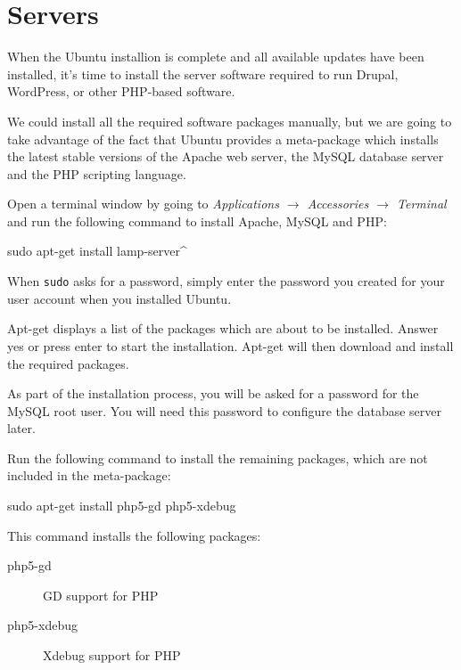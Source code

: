 \documentclass[ebook,10pt,twoside,openright]{memoir}
\begin{document}
\chapter{Servers} \label{chservers}

\noindent
When the Ubuntu installion is complete and all available updates have been installed, it’s time to install the server software required to run Drupal, WordPress, or other PHP-based software.

We could install all the required software packages manually, but we are going to take advantage of the fact that Ubuntu provides a meta-package which installs the latest stable versions of the Apache web server, the MySQL database server and the PHP scripting language.

Open a terminal window by going to \emph{Applications $\rightarrow$ Accessories $\rightarrow$ Terminal} and run the following command to install Apache, MySQL and PHP:

\begin{squashboxcommand}
sudo apt-get install lamp-server^
\end{squashboxcommand}

When \verb!sudo! asks for a password, simply enter the password you created for your user account when you installed Ubuntu.

Apt-get displays a list of the packages which are about to be installed. Answer yes or press enter to start the installation. Apt-get will then download and install the required packages.
  
As part of the installation process, you will be asked for a password for the MySQL root user. You will need this password to configure the database server later.

Run the following command to install the remaining packages, which are not included in the meta-package:

\begin{squashboxcommand}
sudo apt-get install php5-gd php5-xdebug
\end{squashboxcommand}

This command installs the following packages:

\begin{description}
\item[php5-gd] GD support for PHP
\item[php5-xdebug] Xdebug support for PHP
\end{description}
\end{document}
